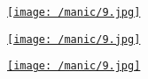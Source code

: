 \href{/manic/9.jpg}{\texttt{[image: /manic/9.jpg]}}

\href{/manic/10.jpg}{\texttt{[image: /manic/9.jpg]}}

\href{/manic/11.jpg}{\texttt{[image: /manic/9.jpg]}}
